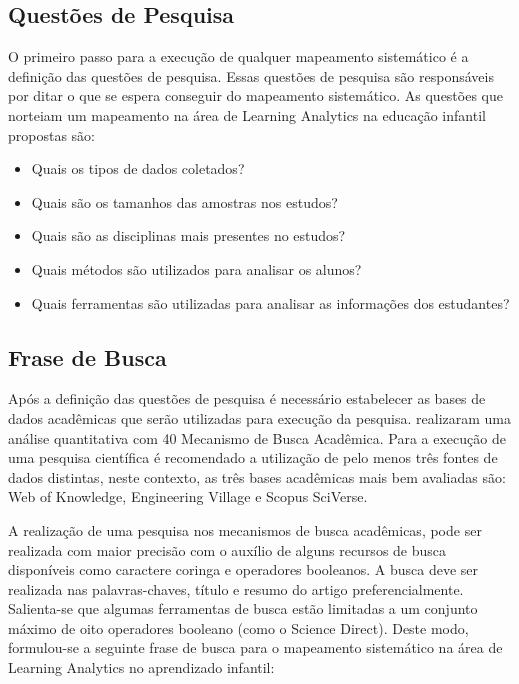 \documentclass[12pt]{article}
\begin{document}
\subsection{Questões de Pesquisa}\label{a:1}

O primeiro passo para a execução de qualquer mapeamento sistemático é a definição das questões de pesquisa. Essas questões de pesquisa são responsáveis por ditar o que se espera conseguir do mapeamento sistemático. As questões que norteiam um mapeamento na área de  Learning Analytics na educação infantil propostas são:

\begin{itemize}
    \item Quais os tipos de dados coletados?
    \item Quais são os tamanhos das amostras nos estudos?
    \item Quais são as disciplinas mais presentes no estudos?
    \item Quais métodos são utilizados para analisar os alunos?
    \item Quais ferramentas são utilizadas para analisar as informações dos estudantes?
\end{itemize}


\subsection{Frase de Busca}\label{a:2}

Após a definição das questões de pesquisa é necessário estabelecer as bases de dados acadêmicas que serão utilizadas para execução da pesquisa.  realizaram uma análise quantitativa com 40 Mecanismo de Busca Acadêmica. Para a execução de uma pesquisa científica é recomendado a utilização de pelo menos três fontes de dados distintas, neste contexto, as três bases acadêmicas mais bem avaliadas são: Web of Knowledge, Engineering Village e Scopus SciVerse. 

A realização de uma pesquisa nos mecanismos de busca acadêmicas, pode ser realizada com maior precisão com o auxílio de alguns recursos de busca disponíveis como caractere coringa e operadores booleanos. A busca deve ser realizada nas palavras-chaves, título e resumo do artigo preferencialmente. Salienta-se que algumas ferramentas de busca estão limitadas a um conjunto máximo de oito operadores booleano (como o Science Direct). Deste modo, formulou-se a seguinte frase de busca para o mapeamento sistemático na área de Learning Analytics no aprendizado infantil: 
\end{document}
